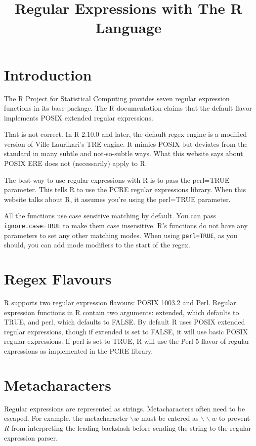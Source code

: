 \documentclass{article}
\title{Regular Expressions with The R Language}
\date{\vspace{-5ex}}
\begin{document}
\maketitle
\tableofcontents
\section{Introduction}


The R Project for Statistical Computing provides seven regular expression functions in its base package. The R documentation claims that the default flavor implements POSIX extended regular expressions. 

That is not correct. In R 2.10.0 and later, the default regex engine is a modified version of Ville Laurikari's TRE engine. It mimics POSIX but deviates from the standard in many subtle and not-so-subtle ways. What this website says about POSIX ERE does not (necessarily) apply to R.


The best way to use regular expressions with R is to pass the perl=TRUE parameter. This tells R to use the PCRE regular expressions library. When this website talks about R, it assumes you're using the perl=TRUE parameter.

All the functions use case sensitive matching by default. You can pass \texttt{ignore.case=TRUE} to make them case insensitive. R's functions do not have any parameters to set any other matching modes. When using \texttt{perl=TRUE}, as you should, you can add mode modifiers to the start of the regex.
\section{Regex Flavours}
R supports two regular expression flavours: POSIX 1003.2 and Perl. Regular expression functions in R contain two arguments: extended, which defaults to TRUE, and perl, which defaults to FALSE. By default R uses POSIX extended regular expressions, though if extended is set to FALSE, it will use basic POSIX regular expressions. If perl is set to TRUE, R will use the Perl 5 flavor of regular expressions as implemented in the PCRE library.
\section{Metacharacters}
Regular expressions are represented as strings. Metacharacters often need to be escaped. For example, the metacharacter $\backslash w$ must be entered as $\backslash\backslash w$ to prevent \emph{R} from interpreting the leading backslash before sending the string to the regular expression parser.
\end{document}
